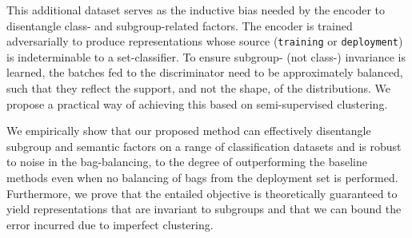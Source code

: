 This additional dataset serves as the inductive bias needed by the encoder to disentangle class-
and subgroup-related factors.
%
The encoder is trained adversarially to produce representations whose source (\texttt{training} or
\texttt{deployment}) is indeterminable to a set-classifier.
%
To ensure subgroup- (not class-) invariance is learned, the batches fed to the discriminator need
to be approximately balanced, such that they reflect the support, and not the shape, of the
distributions. 
%
We propose a practical way of achieving this based on semi-supervised clustering.
%

We empirically show that our proposed method can effectively disentangle subgroup and semantic
factors on a range of classification datasets and is robust to noise in the bag-balancing, to the
degree of outperforming the baseline methods even when no balancing of bags from the deployment set
is performed.
%
Furthermore, we prove that the entailed objective is theoretically guaranteed to yield
representations that are invariant to subgroups and that we can bound the error incurred due to
imperfect clustering.

